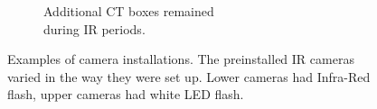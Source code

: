 \begin{figure}
\begin{subfigure}{.5\textwidth}
		  \caption{Additional CT boxes remained\\ during IR periods.}
		  	\label{fig:cam_ex_d}
	\end{subfigure}
		\caption[Examples of camera installations]
		{Examples of camera installations.  \small %
		The preinstalled IR cameras varied in the way they were set up. Lower cameras had Infra-Red flash, upper cameras had white LED flash.}
\end{figure}


